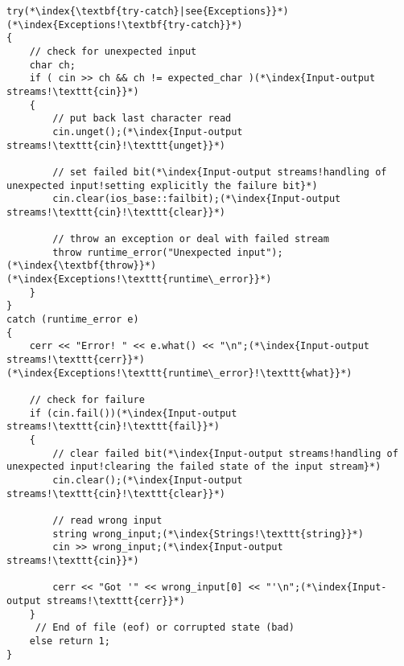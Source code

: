 \documentclass[10pt]{book}
\begin{document}
\begin{lstlisting}
try(*\index{\textbf{try-catch}|see{Exceptions}}*)(*\index{Exceptions!\textbf{try-catch}}*)
{
    // check for unexpected input
    char ch;
    if ( cin >> ch && ch != expected_char )(*\index{Input-output streams!\texttt{cin}}*)
    {
        // put back last character read
        cin.unget();(*\index{Input-output streams!\texttt{cin}!\texttt{unget}}*)
        
        // set failed bit(*\index{Input-output streams!handling of unexpected input!setting explicitly the failure bit}*)
        cin.clear(ios_base::failbit);(*\index{Input-output streams!\texttt{cin}!\texttt{clear}}*)
    
        // throw an exception or deal with failed stream
        throw runtime_error("Unexpected input");(*\index{\textbf{throw}}*)(*\index{Exceptions!\texttt{runtime\_error}}*)
    }
}
catch (runtime_error e)
{
    cerr << "Error! " << e.what() << "\n";(*\index{Input-output streams!\texttt{cerr}}*)(*\index{Exceptions!\texttt{runtime\_error}!\texttt{what}}*)
            
    // check for failure
    if (cin.fail())(*\index{Input-output streams!\texttt{cin}!\texttt{fail}}*)
    {
        // clear failed bit(*\index{Input-output streams!handling of unexpected input!clearing the failed state of the input stream}*)
        cin.clear();(*\index{Input-output streams!\texttt{cin}!\texttt{clear}}*)
                
        // read wrong input
        string wrong_input;(*\index{Strings!\texttt{string}}*)
        cin >> wrong_input;(*\index{Input-output streams!\texttt{cin}}*)
                    
        cerr << "Got '" << wrong_input[0] << "'\n";(*\index{Input-output streams!\texttt{cerr}}*)
    }
     // End of file (eof) or corrupted state (bad)
    else return 1;
}
\end{lstlisting}
%
%
\end{document}
